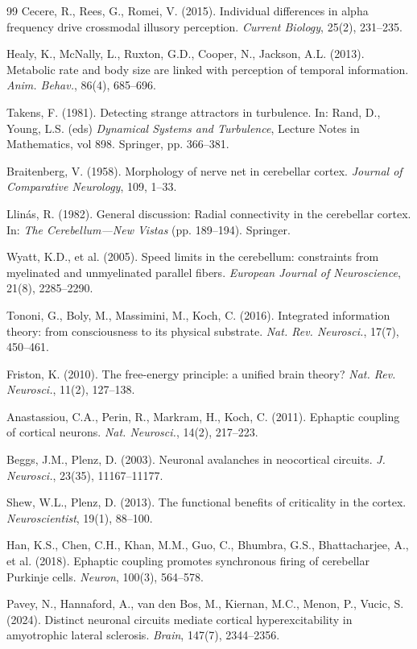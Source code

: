 \documentclass[12pt]{article}
\begin{document}
\begin{thebibliography}{99}
Cecere, R., Rees, G., Romei, V. (2015). Individual differences in alpha frequency drive crossmodal illusory perception. \textit{Current Biology}, 25(2), 231--235.

Healy, K., McNally, L., Ruxton, G.D., Cooper, N., Jackson, A.L. (2013). Metabolic rate and body size are linked with perception of temporal information. \textit{Anim. Behav.}, 86(4), 685--696.

Takens, F. (1981). Detecting strange attractors in turbulence. In: Rand, D., Young, L.S. (eds) \textit{Dynamical Systems and Turbulence}, Lecture Notes in Mathematics, vol 898. Springer, pp. 366--381.

Braitenberg, V. (1958). Morphology of nerve net in cerebellar cortex. \textit{Journal of Comparative Neurology}, 109, 1--33.

Llin\'{a}s, R. (1982). General discussion: Radial connectivity in the cerebellar cortex. In: \textit{The Cerebellum---New Vistas} (pp. 189--194). Springer.

Wyatt, K.D., et al. (2005). Speed limits in the cerebellum: constraints from myelinated and unmyelinated parallel fibers. \textit{European Journal of Neuroscience}, 21(8), 2285--2290.

Tononi, G., Boly, M., Massimini, M., Koch, C. (2016). Integrated information theory: from consciousness to its physical substrate. \textit{Nat. Rev. Neurosci.}, 17(7), 450--461.

Friston, K. (2010). The free-energy principle: a unified brain theory? \textit{Nat. Rev. Neurosci.}, 11(2), 127--138.

Anastassiou, C.A., Perin, R., Markram, H., Koch, C. (2011). Ephaptic coupling of cortical neurons. \textit{Nat. Neurosci.}, 14(2), 217--223.

Beggs, J.M., Plenz, D. (2003). Neuronal avalanches in neocortical circuits. \textit{J. Neurosci.}, 23(35), 11167--11177.

Shew, W.L., Plenz, D. (2013). The functional benefits of criticality in the cortex. \textit{Neuroscientist}, 19(1), 88--100.

Han, K.S., Chen, C.H., Khan, M.M., Guo, C., Bhumbra, G.S., Bhattacharjee, A., et al. (2018). Ephaptic coupling promotes synchronous firing of cerebellar Purkinje cells. \textit{Neuron}, 100(3), 564--578.

Pavey, N., Hannaford, A., van den Bos, M., Kiernan, M.C., Menon, P., Vucic, S. (2024). Distinct neuronal circuits mediate cortical hyperexcitability in amyotrophic lateral sclerosis. \textit{Brain}, 147(7), 2344--2356.

\end{thebibliography}
\end{document}
